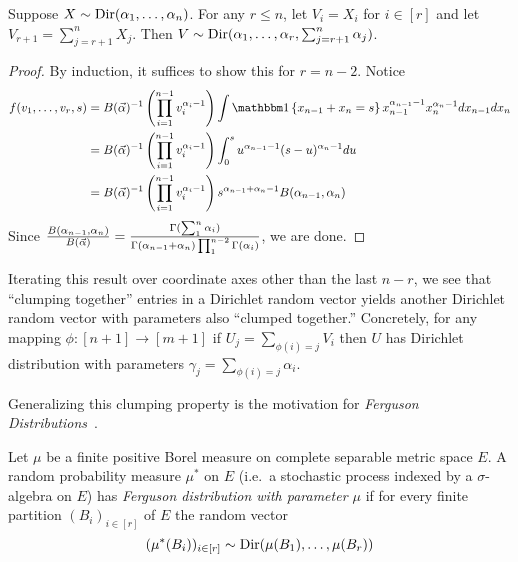 \begin{proposition}
  Suppose $X \sim \mathrm{Dir}(\alpha_1, \ldots, \alpha_{n})$.
  For any $r \leq n$, let $V_i = X_i$ for $i \in [r]$
  and let $V_{r+1} = \sum_{j=r+1}^n X_j$.
  Then $V \sim \mathrm{Dir}(\alpha_1, \ldots, \alpha_{r}, \sum_{j=r+1}^n \alpha_j)$.
\end{proposition}

\begin{proof}
  By induction, it suffices to show this for $r = n-2$. Notice
  \begin{align*}
    f(v_1, \ldots, v_r, s)
    &= B(\valpha)^{-1} \left(\prod_{i=1}^{n-1} v_i^{\alpha_i - 1}\right)
    \int \ind\left\{
      x_{n-1} + x_n = s
    \right\} x_{n-1}^{\alpha_{n-1} - 1} x_n^{\alpha_n - 1}
    dx_{n-1} dx_n \\
    &= B(\valpha)^{-1} \left(\prod_{i=1}^{n-1} v_i^{\alpha_i - 1}\right)
    \int_0^s u^{\alpha_{n-1} - 1} (s-u)^{\alpha_n - 1} du \\
    &= B(\valpha)^{-1} \left(\prod_{i=1}^{n-1} v_i^{\alpha_i - 1}\right)
    s^{\alpha_{n-1} + \alpha_n - 1} B(\alpha_{n-1}, \alpha_n)
  \end{align*}
  Since $\frac{B(\alpha_{n-1}, \alpha_n)}{B(\vec{\alpha})} = \frac{\Gamma(\sum_1^n \alpha_i)}{\Gamma(\alpha_{n-1} + \alpha_n) \prod_1^{n-2} \Gamma(\alpha_i)}$, we are done.
\end{proof}

Iterating this result over coordinate axes other than the last $n-r$,
we see that ``clumping together'' entries in a Dirichlet
random vector yields another Dirichlet random vector with parameters also
``clumped together.'' Concretely, for any mapping $\phi : [n+1] \to [m+1]$ if
$U_j = \sum_{\phi(i) = j} V_i$ then $U$ has Dirichlet distribution with
parameters $\gamma_j = \sum_{\phi(i) = j} \alpha_i$.

Generalizing this clumping property is the motivation for \emph{Ferguson
Distributions}~\citep{ferguson1973}.

\begin{definition}
  Let $\mu$ be a finite positive Borel measure on complete separable metric
  space $E$.
  A random probability measure $\mu^*$ on $E$ (i.e.\ a stochastic process
  indexed by a $\sigma$-algebra on $E$) has \emph{Ferguson distribution with
  parameter $\mu$} if for every finite partition $(B_i)_{i \in [r]}$ of $E$ the
  random vector
  \[
    (\mu^*(B_i))_{i \in [r]} \sim \mathrm{Dir}(\mu(B_1), \ldots, \mu(B_r))
  \]
\end{definition}

